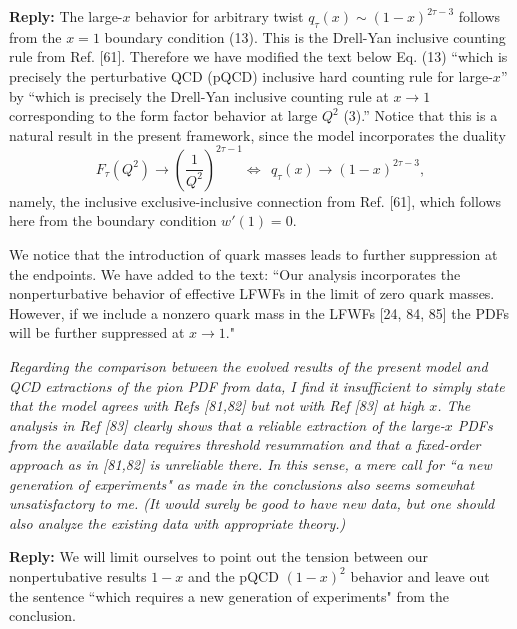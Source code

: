 \documentclass[12pt]{article}
\begin{document}
{\bf Reply:}  The large-$x$ behavior for arbitrary twist $q_\tau(x) \sim (1-x)^{2 \tau -3}$ follows from the $x = 1$ boundary condition (13). 
This is the Drell-Yan inclusive counting rule from Ref. [61].  Therefore we have modified the text below Eq. (13) ``which is precisely the perturbative QCD (pQCD) inclusive hard counting rule for large-$x$'' by  ``which is precisely the Drell-Yan inclusive counting rule at $x \to 1$  corresponding to the form factor behavior  at large $Q^2$ (3).''  Notice that this is a natural result in the present framework, since the model incorporates the duality
$$ F_\tau(Q^2) \to \left(\frac{1}{Q^2}\right)^{2 \tau - 1}        \Longleftrightarrow ~~  q_\tau(x) \to (1-x)^{2 \tau - 3},$$
namely, the inclusive exclusive-inclusive connection from Ref. [61], which follows here from the boundary condition $w'(1) = 0$.

We notice that the introduction of quark masses leads to further suppression at the endpoints. We have added to the text:  ``Our analysis incorporates the nonperturbative behavior of effective LFWFs in the limit of zero quark masses. However, if we include a nonzero quark mass in the LFWFs [24, 84, 85] the PDFs will be further suppressed at $x \to 1$."

{\it Regarding the comparison between the evolved results of the present
model and QCD extractions of the pion PDF from data, I find it
insufficient to simply state that the model agrees with Refs [81,82]
but not with Ref [83] at high $x$. The analysis in Ref [83] clearly
shows that a reliable extraction of the large-$x$ PDFs from the
available data requires threshold resummation and that a fixed-order
approach as in [81,82] is unreliable there. In this sense, a mere call
for ``a new generation of experiments" as made in the conclusions also
seems somewhat unsatisfactory to me. (It would surely be good to have
new data, but one should also analyze the existing data with
appropriate theory.)}

{\bf Reply:} We will limit ourselves to point out the tension between  our nonpertubative results $1-x$ and the pQCD $(1-x)^2$ behavior and leave out the sentence ``which requires a new generation of experiments" from the conclusion.
\end{document}

